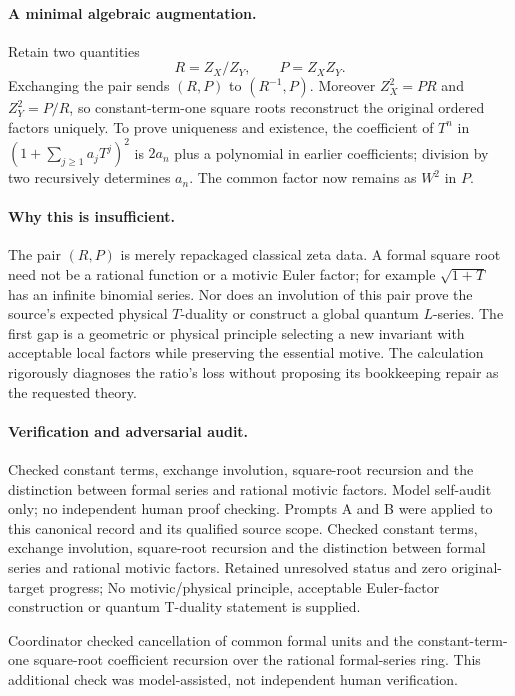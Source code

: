 \documentclass[11pt]{article}
\begin{document}
\paragraph{A minimal algebraic augmentation.} Retain two quantities
\[
 R=Z_X/Z_Y,\qquad P=Z_XZ_Y.
\]
Exchanging the pair sends $(R,P)$ to $(R^{-1},P)$. Moreover $Z_X^2=PR$ and $Z_Y^2=P/R$, so constant-term-one square roots reconstruct the original ordered factors uniquely. To prove uniqueness and existence, the coefficient of $T^n$ in $(1+\sum_{j\geq1}a_jT^j)^2$ is $2a_n$ plus a polynomial in earlier coefficients; division by two recursively determines $a_n$. The common factor now remains as $W^2$ in $P$.

\paragraph{Why this is insufficient.} The pair $(R,P)$ is merely repackaged classical zeta data. A formal square root need not be a rational function or a motivic Euler factor; for example $\sqrt{1+T}$ has an infinite binomial series. Nor does an involution of this pair prove the source's expected physical $T$-duality or construct a global quantum $L$-series. The first gap is a geometric or physical principle selecting a new invariant with acceptable local factors while preserving the essential motive. The calculation rigorously diagnoses the ratio's loss without proposing its bookkeeping repair as the requested theory.

\paragraph{Verification and adversarial audit.}
Checked constant terms, exchange involution, square-root recursion and the distinction between formal series and rational motivic factors. Model self-audit only; no independent human proof checking. Prompts A and B were applied to this canonical record and its qualified source scope. Checked constant terms, exchange involution, square-root recursion and the distinction between formal series and rational motivic factors. Retained unresolved status and zero original-target progress; No motivic/physical principle, acceptable Euler-factor construction or quantum T-duality statement is supplied.

Coordinator checked cancellation of common formal units and the constant-term-one square-root coefficient recursion over the rational formal-series ring. This additional check was model-assisted, not independent human verification.
\end{document}
